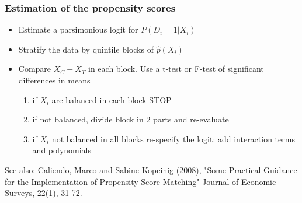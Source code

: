 \documentclass[notes=show,beamer,compress]{beamer}
\begin{document}
\begin{frame}
\frametitle{Estimation of the propensity scores}


\begin{itemize}
  \item Estimate a parsimonious logit for $P(D_i=1|X_i)$
  \item Stratify the data by quintile blocks of $\hat{p}(X_i)$
  \item Compare $\bar{X}_C-\bar{X}_T$ in each block. Use a t-test or F-test of significant differences in means
\begin{enumerate}
  \item if $X_i$ are balanced in each block STOP
  \item if not balanced, divide block in 2 parts and re-evaluate
  \item if $X_i$ not balanced in all blocks re-specify the logit: add interaction terms and polynomials
\end{enumerate}
\end{itemize}
See also:   Caliendo, Marco and Sabine Kopeinig (2008), "Some Practical Guidance for the Implementation of Propensity Score Matching" Journal of Economic Surveys, 22(1), 31-72.	
\end{frame}



 
\end{document}
